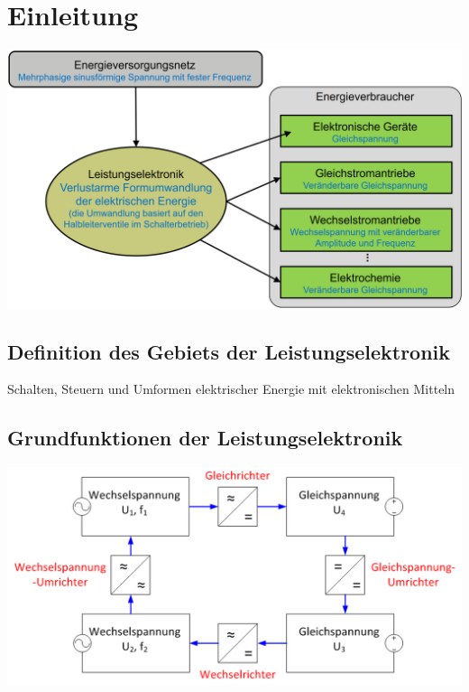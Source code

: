 \section{Einleitung}

\includegraphics[width=\columnwidth]{images/Bild0.png}

\subsection{Definition des Gebiets der Leistungselektronik}
Schalten, Steuern und Umformen elektrischer Energie mit elektronischen Mitteln

\subsection{Grundfunktionen der Leistungselektronik}
\includegraphics[width=\columnwidth]{images/Bild1.png}
